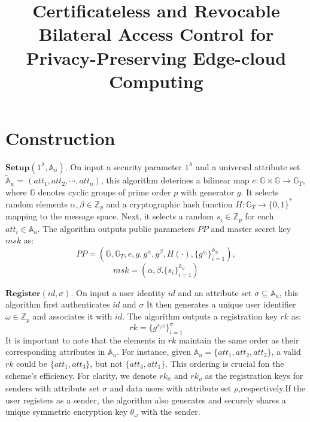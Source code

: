 \documentclass[runningheads]{llncs}
\begin{document}
\title{Certificateless and Revocable Bilateral Access Control for Privacy-Preserving Edge-cloud Computing}

\section{Construction}
$\mathbf{Setup}(1^\lambda,\mathbb{A}_u).$ On input a security parameter $1^\lambda$ and a universal attribute set $\tilde{\mathbb{A} } _u$ = $( att_1, att_2, \cdots , att_n)$, this algorithm deterines a bilinear map $e:\mathbb{G}\times\mathbb{G}\to\mathbb{G}_T$, where $\mathbb{G}$ denotes cyclic groups of prime order $p$ with generator $g.$ It selects random elements $\alpha,\beta\in\mathbb{Z}_p$ and a cryptographic hash function $H:\mathbb{G}_T\to\{0,1\}^*$ mapping to the message space.
Next, it selects a random $s_i\in\mathbb{Z}_p$ for each $att_i\in\mathbb{A}_u.$ The algorithm outputs public parameters $PP$ and master secret key $msk$ as:
$$PP=(\mathbb{G},\mathbb{G}_T,e,g,g^\alpha,g^\beta,H(\cdot),\{g^{s_i}\}_{i=1}^{\mathbb{A}_u}),$$
$$msk=(\alpha,\beta.\{s_i\}_{i=1}^{\mathbb{A}_u})$$

$\textbf{Register}( id, \sigma ) .$ On input a user identity $id$ and an attribute set $\sigma\subseteq\mathbb{A}_u$, this algorithm fırst authenticates $id$ and $\sigma$ It then generates a unique user identifier $\omega\in\mathbb{Z}_p$ and associates it with $id.$ The algorithm outputs a registration key $rk$ as:
$$rk=\{g^{s_i\omega}\}_{i=1}^\sigma $$
It is important to note that the elements in $rk$ maintain the same order as their corresponding attributes in $\mathbb{A}_u.$ For instance, given $\mathbb{A} _u= \{ att_1, att_2, att_3\}$, a valid $rk$ could be $\{att_1,att_3\}$, but not $\{att_3,att_1\}.$ This ordering is crucial fon the scheme's efficiency. For clarity, we denote $rk_\sigma$ and $rk_\rho$ as the registration keys for senders with attribute set $\sigma$ and data users with attribute set $\rho$,respectively.If the user registers as a sender, the algorithm also generates and securely shares a unique symmetric encryption key $\theta_\omega$ with the sender.
\end{document}
